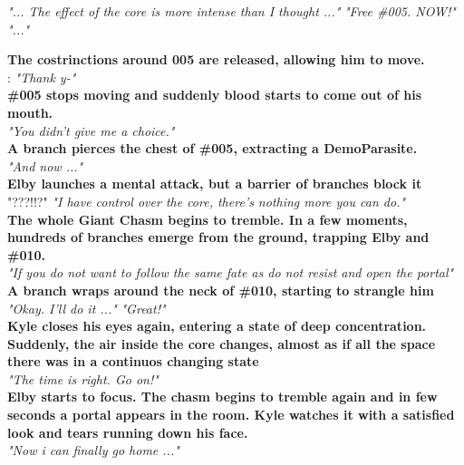 \begin{dialogue}
	 \textit{"... The effect of the core is more intense than I thought ..."}
	 \textit{"Free \#005. NOW!"}
	 \textit{"..."}
	
	\textbf{The costrinctions around 005 are released, allowing him to move.}\\
	
	: \textit{"Thank y-"}\\
	
	\textbf{\#005 stops moving and suddenly blood starts to come out of his mouth.}\\
	
	 \textit{"You didn't give me a choice."}\\
	
	\textbf{A branch pierces the chest of \#005, extracting a DemoParasite.}\\
	
	 
	 
	 \textit{"And now ..."}
	 
	 \\
	
	\textbf{Elby launches a mental attack, but a barrier of branches block it}\\
	 "???!!?"
	 
	 \textit{"I have control over the core, there's nothing more you can do."}\\
	
	\textbf{The whole Giant Chasm begins to tremble. In a few moments, hundreds of branches emerge from the ground, trapping Elby and \#010.}\\
	
	 \textit{"If you do not want to follow the same fate as  do not resist and open the portal"}\\
	
	\textbf{A branch wraps around the neck of \#010, starting to strangle him}\\
	
	  \textit{"Okay. I'll do it ..."}
	 \textit{"Great!"}\\
	
	\textbf{Kyle closes his eyes again, entering a state of deep concentration. Suddenly, the air inside the core changes, almost as if all the space there was in a continuos changing state}\\
	
	 \textit{"The time is right. Go on!"}\\
	
	\textbf{Elby starts to focus. The chasm begins to tremble again and in few seconds a portal appears in the room. Kyle watches it with a satisfied look and tears running down his face.}\\
	
	 \textit{"Now i can finally go home ..."}
\end{dialogue}